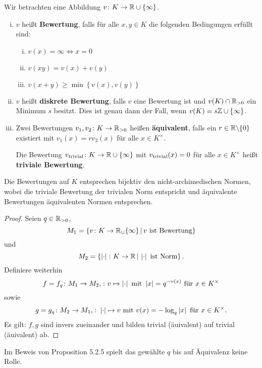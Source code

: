 \begin{defi}
Wir betrachten eine Abbildung $v\colon K \to \mathbb{R} \cup \{\infty \}$.
\begin{enumerate}[(i)]
\item $v$ heißt \textbf{Bewertung}, falls für alle $x,y \in K$ die folgenden Bedingungen erfüllt sind:
		\begin{enumerate}[(i)]
			\item $v(x) = \infty\Leftrightarrow x = 0$
			\item $v(xy) = v(x) + v(y)$
			\item $v(x+y) \geq \min \left\{ v(x), v(y) \right\}$
		\end{enumerate}
\item $v$ heißt \textbf{diskrete Bewertung}, falls $v$ eine Bewertung ist und $v(K) \cap \mathbb{R}_{>0}$ ein Minimum $s$ besitzt. Dies ist genau dann der Fall, wenn $v(K) = s\mathbb{Z} \cup \{\infty \}$.
\item Zwei Bewertungen $v_1, v_2 \colon K \to \mathbb{R}_{>0}$ heißen \textbf{äquivalent}, falls ein $r \in \mathbb{R}\backslash\{0\}$ existiert mit $v_1(x) = rv_2(x)$ für alle $x \in K^\times$.

Die Bewertung $v_{\operatorname{trivial}} \colon K \to \mathbb{R} \cup \{\infty \}$ mit $v_{\operatorname{trivial}}(x) = 0$ für alle $x \in K^\times$
heißt \textbf{triviale Bewertung}.
\end{enumerate}
\end{defi}


\begin{Prop}
Die Bewertungen auf $K$ entsprechen bijektiv den nicht-archimedischen Normen, wobei die triviale Bewertung der trivialen Norm entspricht und äquivalente Bewertungen äquivalenten Normen entsprechen.
\end{Prop}

\begin{proof}
Seien $q \in \mathbb{R}_{>0}$,
\[ M_1 = \left\{ v\colon K \to \mathbb{R}_\cup\{\infty \} \, | \, v \text{ ist Bewertung}   \right\}
\]
und 
\[ M_2 = \left\{ \left|{\cdot}\right| \colon K \to \mathbb{R} \, | \, \left|{\cdot}\right| \text{ ist Norm}   \right\}.
\]
Definiere weiterhin
\[ f = f_q \colon M_1 \to M_2, \colon v \mapsto \left|{\cdot}\right|
\text{ mit } \left|{x}\right| = q^{-v(x)} \text{ für } x \in K^\times
\]
sowie
\[ g = g_q \colon M_2 \to M_1, \colon \left|{\cdot}\right| \mapsto v
\text{ mit } v(x)=-\log_q \left|{x}\right| \text{ für } x \in K^\times.
\]
Es gilt: $f,g$ sind invers zueinander und bilden trivial (äuivalent) auf trivial (äuivalent) ab.
\end{proof}


\begin{Bem}
Im Beweis von Proposition 5.2.5 spielt das gewählte $q$ bis auf Äquivalenz keine Rolle.
\end{Bem}

